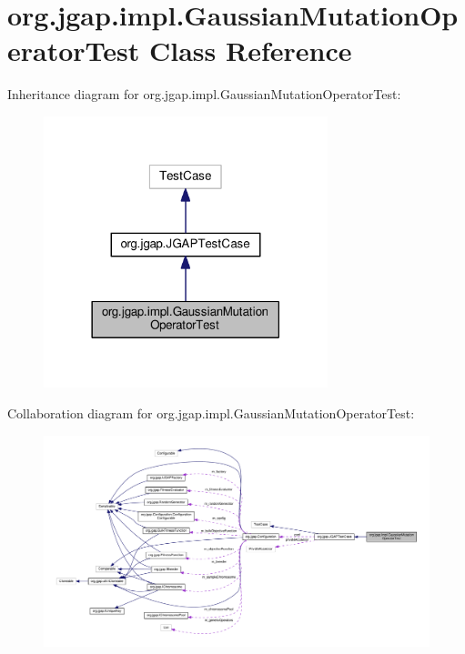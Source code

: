 \hypertarget{classorg_1_1jgap_1_1impl_1_1_gaussian_mutation_operator_test}{\section{org.\-jgap.\-impl.\-Gaussian\-Mutation\-Operator\-Test Class Reference}
\label{classorg_1_1jgap_1_1impl_1_1_gaussian_mutation_operator_test}
}


Inheritance diagram for org.\-jgap.\-impl.\-Gaussian\-Mutation\-Operator\-Test\-:
\nopagebreak
\begin{figure}[H]
\begin{center}
\leavevmode
\includegraphics[width=234pt]{classorg_1_1jgap_1_1impl_1_1_gaussian_mutation_operator_test__inherit__graph}
\end{center}
\end{figure}


Collaboration diagram for org.\-jgap.\-impl.\-Gaussian\-Mutation\-Operator\-Test\-:
\nopagebreak
\begin{figure}[H]
\begin{center}
\leavevmode
\includegraphics[width=350pt]{classorg_1_1jgap_1_1impl_1_1_gaussian_mutation_operator_test__coll__graph}
\end{center}
\end{figure}
